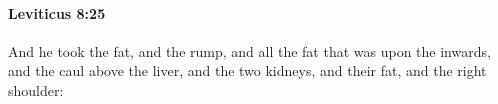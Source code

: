 
		\paragraph{Leviticus 8:25} %
			\label{LEVITICUS-8-25}

			And he took the fat, and the rump, and all the fat that was upon the inwards, and the caul above the liver, and the two kidneys, and their fat, and the right shoulder:


